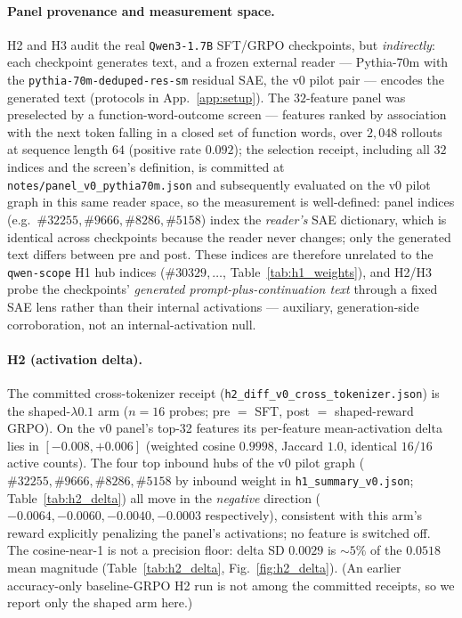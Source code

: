 \documentclass{article}
\begin{document}
\paragraph{Panel provenance and measurement space.} H2 and H3 audit the real \texttt{Qwen3-1.7B} SFT/GRPO checkpoints, but \emph{indirectly}: each checkpoint generates text, and a frozen external reader --- Pythia-70m with the \texttt{pythia-70m-deduped-res-sm} residual SAE, the v0 pilot pair --- encodes the generated text (protocols in App.~\ref{app:setup}). The $32$-feature panel was preselected by a function-word-outcome screen --- features ranked by association with the next token falling in a closed set of function words, over $2{,}048$ rollouts at sequence length $64$ (positive rate $0.092$); the selection receipt, including all $32$ indices and the screen's definition, is committed at \texttt{notes/panel\_v0\_pythia70m.json} and subsequently evaluated on the v0 pilot graph in this same reader space, so the measurement is well-defined: panel indices (e.g.\ $\#32255, \#9666, \#8286, \#5158$) index the \emph{reader's} SAE dictionary, which is identical across checkpoints because the reader never changes; only the generated text differs between pre and post. These indices are therefore unrelated to the \texttt{qwen-scope} H1 hub indices ($\#30329,\ldots$, Table~\ref{tab:h1_weights}), and H2/H3 probe the checkpoints' \emph{generated prompt-plus-continuation text} through a fixed SAE lens rather than their internal activations --- auxiliary, generation-side corroboration, not an internal-activation null.

\paragraph{H2 (activation delta).} The committed cross-tokenizer receipt (\texttt{h2\_diff\_v0\_cross\_tokenizer.json}) is the shaped-$\lambda0.1$ arm ($n=16$ probes; pre $=$ SFT, post $=$ shaped-reward GRPO). On the v0 panel's top-32 features its per-feature mean-activation delta lies in $[-0.008, +0.006]$ (weighted cosine $0.9998$, Jaccard $1.0$, identical $16/16$ active counts). The four top inbound hubs of the v0 pilot graph ($\#32255, \#9666, \#8286, \#5158$ by inbound weight in \texttt{h1\_summary\_v0.json}; Table~\ref{tab:h2_delta}) all move in the \emph{negative} direction ($-0.0064, -0.0060, -0.0040, -0.0003$ respectively), consistent with this arm's reward explicitly penalizing the panel's activations; no feature is switched off. The cosine-near-1 is not a precision floor: delta SD $0.0029$ is $\sim\!5\%$ of the $0.0518$ mean magnitude (Table~\ref{tab:h2_delta}, Fig.~\ref{fig:h2_delta}). (An earlier accuracy-only baseline-GRPO H2 run is not among the committed receipts, so we report only the shaped arm here.)
\end{document}
